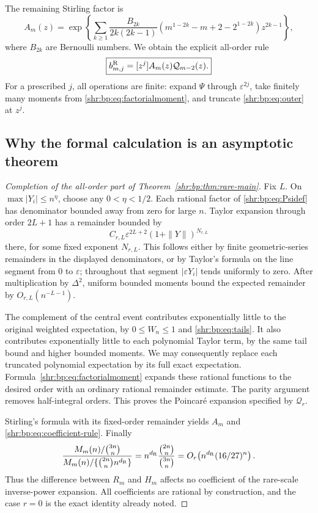 \documentclass[11pt,letterpaper]{article}
\numberwithin{equation}{section}
\theoremstyle{definition}
\newcommand{\1}{\mathbf 1}
\newcommand{\eps}{\varepsilon}
\begin{document}
The remaining Stirling factor is
\begin{equation}
 A_m(z)=\exp\left\{
 \sum_{k\ge1}\frac{B_{2k}}{2k(2k-1)}
 \left(m^{1-2k}-m+2-2^{1-2k}\right)z^{2k-1}
 \right\},
 \label{shr:bp:eq:outer}
\end{equation}
where $B_{2k}$ are Bernoulli numbers. We obtain the explicit all-order rule
\begin{equation}
 \boxed{\displaystyle
 b_{m,j}^{\rm R}=[z^j]A_m(z)\mathcal Q_{m-2}(z).}
 \label{shr:bp:eq:coefficient-rule}
\end{equation}
For a prescribed $j$, all operations are finite: expand $\Psi$ through
$\eps^{2j}$, take finitely many moments from
\eqref{shr:bp:eq:factorialmoment}, and truncate \eqref{shr:bp:eq:outer} at $z^j$.

\subsection{Why the formal calculation is an asymptotic theorem}
\begin{proof}[Completion of the all-order part of Theorem~\ref{shr:bp:thm:rare-main}]
Fix $L$. On $\max|Y_i|\le n^\eta$, choose any $0<\eta<1/2$.
Each rational factor of \eqref{shr:bp:eq:Psidef} has denominator bounded away
from zero for large $n$. Taylor expansion through order $2L+1$ has a
remainder bounded by
\[
 C_{r,L}\eps^{2L+2}(1+\|Y\|)^{N_{r,L}}
\]
there, for some fixed exponent $N_{r,L}$. This follows either by finite
geometric-series remainders in the displayed denominators, or by Taylor's
formula on the line segment from $0$ to $\eps$; throughout that segment
$|\eps Y_i|$ tends uniformly to zero. After multiplication by $\Delta^2$,
uniform bounded moments bound the expected remainder by
$O_{r,L}(n^{-L-1})$.

The complement of the central event contributes exponentially little to
the original weighted expectation, by $0\le W_n\le1$ and
\eqref{shr:bp:eq:tails}. It also contributes exponentially little to each
polynomial Taylor term, by the same tail bound and higher bounded
moments. We may consequently replace each truncated polynomial expectation
by its full exact expectation. Formula~\eqref{shr:bp:eq:factorialmoment} expands
these rational functions to the desired order with an ordinary rational
remainder estimate. The parity argument removes half-integral orders.
This proves the Poincar\'e expansion specified by $\mathcal Q_r$.

Stirling's formula with its fixed-order remainder yields $A_m$ and
\eqref{shr:bp:eq:coefficient-rule}. Finally
\[
 \frac{M_m(n)/\binom{3n}{n}}
 {M_m(n)/\{\binom{2n}{n}n^{d_{\rm R}}\}}
 =n^{d_{\rm R}}\frac{\binom{2n}{n}}{\binom{3n}{n}}
 =O_r\!\left(n^{d_{\rm R}}(16/27)^n\right).
\]
Thus the difference between $R_m$ and $H_m$ affects no coefficient of the
rare-scale inverse-power expansion. All coefficients are rational by
construction, and the case $r=0$ is the exact identity already noted.
\end{proof}
\end{document}
